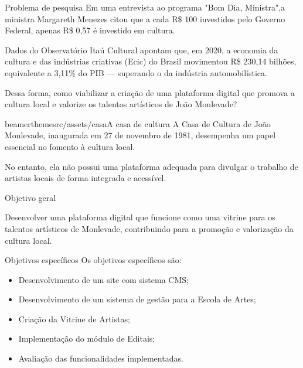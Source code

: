 \begin{frame}{Problema de pesquisa}
Em uma entrevista ao programa "Bom Dia, Ministra",a ministra Margareth Menezes citou que a cada R\$ 100 investidos pelo Governo Federal, apenas R\$ 0,57 é investido em cultura.

\vspace{\baselineskip}

Dados do Observatório Itaú Cultural apontam que, em 2020, a economia da cultura e das indústrias criativas (Ecic) do Brasil movimentou R\$ 230,14 bilhões, equivalente a 3,11\% do PIB — superando o da indústria automobilística.

\vspace{\baselineskip}

Dessa forma, como viabilizar a criação de uma plataforma digital que promova a cultura local e valorize os talentos artísticos de João Monlevade?

\end{frame}

\begin{sidepic}{beamerthemesrc/assets/casa}{A casa de cultura}
A Casa de Cultura de João Monlevade, inaugurada em 27 de novembro
de 1981, desempenha um papel essencial no fomento à cultura local. 

\vspace{\baselineskip}

No entanto, ela não possui uma plataforma adequada para divulgar o trabalho de artistas locais de forma integrada e acessível.
\end{sidepic}

\begin{frame}{Objetivo geral}

Desenvolver uma plataforma digital que funcione
como uma vitrine para os talentos artísticos de Monlevade, contribuindo para a promoção e
valorização da cultura local.

\end{frame}

\begin{frame}{Objetivos específicos}
Os objetivos específicos são:

\begin{itemize}
  \item Desenvolvimento de um site com sistema CMS;
  \item Desenvolvimento de um sistema de gestão para a Escola de Artes;
  \item Criação da Vitrine de Artistas;
  \item Implementação do módulo de Editais;
  \item Avaliação das funcionalidades implementadas.
\end{itemize}
\end{frame}

